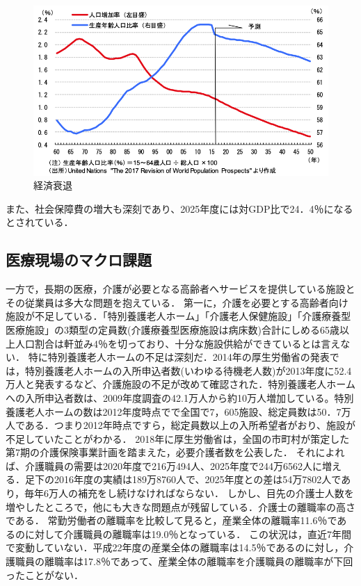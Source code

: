 \begin{figure}[htb]
 \begin{center}
 \includegraphics[scale=0.6]{figures/population_GDP_relation}
 \caption[経済衰退]{経済衰退 \label{population_GDP_relation}}
 \end{center}
\end{figure}

また、社会保障費の増大も深刻であり、2025年度には対GDP比で24．4％になるとされている\cite{social_security}．

\subsection{医療現場のマクロ課題}

一方で，長期の医療，介護が必要となる高齢者へサービスを提供している施設とその従業員は多大な問題を抱えている．
第一に，介護を必要とする高齢者向け施設が不足している．「特別養護老人ホーム」「介護老人保健施設」「介護療養型医療施設」の3類型の定員数(介護療養型医療施設は病床数)合計にしめる65歳以上人口割合は軒並み4％を切っており、十分な施設供給ができているとは言えない\cite{lack_facility_1}．
特に特別養護老人ホームの不足は深刻だ．2014年の厚生労働省の発表では，特別養護老人ホームの入所申込者数(いわゆる待機老人数)が2013年度に52.4万人と発表するなど、介護施設の不足が改めて確認された．特別養護老人ホームへの入所申込者数は、2009年度調査の42.1万人から約10万人増加している。特別養護老人ホームの数は2012年度時点でで全国で7，605施設、総定員数は50．7万人である．つまり2012年時点ですら，総定員数以上の入所希望者がおり、施設が不足していたことがわかる\cite{lack_facility_2}．
2018年に厚生労働省は，全国の市町村が策定した第7期の介護保険事業計画を踏まえた，必要介護者数を公表した．
それによれば、介護職員の需要は2020年度で216万494人、2025年度で244万6562人に増える．足下の2016年度の実績は189万8760人で、2025年度との差は54万7802人であり，毎年6万人の補充をし続けなければならない．
しかし、目先の介護士人数を増やしたところで，他にも大きな問題点が残留している．介護士の離職率の高さである．
常勤労働者の離職率を比較して見ると，産業全体の離職率11.6％であるのに対して介護職員の離職率は19.0％となっている．
この状況は，直近7年間で変動していない．平成22年度の産業全体の離職率は14.5％であるのに対し，介護職員の離職率は17.8％であって、産業全体の離職率を介護職員の離職率が下回ったことがない．

